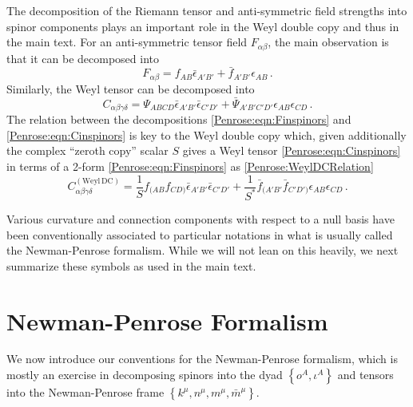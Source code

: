 The decomposition of the Riemann tensor and anti-symmetric field strengths into spinor components plays an important role in the Weyl double copy and thus in the main text. For an anti-symmetric tensor field $F_{\alpha \beta}$, the main observation is that it can be decomposed into
\begin{equation}\label{Penrose:eqn:Finspinors}
F_{\alpha \beta} = f_{AB} \bar{\epsilon}_{A' B'} +  \bar{f}_{A'B'} \epsilon_{A B} \, .
\end{equation}
Similarly, the Weyl tensor can be decomposed into
\begin{equation}\label{Penrose:eqn:Cinspinors}
C_{\alpha \beta \gamma \delta} = \Psi_{ABCD}\bar{\epsilon}_{A' B'}  \bar{\epsilon}_{C' D'} + \bar{\Psi}_{A'B'C'D'} \epsilon_{A B}  \epsilon_{C D} \, . 
\end{equation}
The relation between the decompositions \eqref{Penrose:eqn:Finspinors} and \eqref{Penrose:eqn:Cinspinors} is key to the Weyl double copy which, given additionally the complex ``zeroth copy'' scalar $S$ gives a Weyl tensor \eqref{Penrose:eqn:Cinspinors} in terms of a 2-form \eqref{Penrose:eqn:Finspinors} as \eqref{Penrose:WeylDCRelation}
\begin{equation}
C^{(\mathrm{Weyl \, DC})}_{\alpha \beta \gamma \delta} = \frac{1}{S}f_{(AB} f_{CD)}\bar{\epsilon}_{A' B'}  \bar{\epsilon}_{C' D'} + \frac{1}{S^*}\bar{f}_{(A'B'} \bar{f}_{C'D')} \epsilon_{A B}  \epsilon_{C D} \, . 
\end{equation}

Various curvature and connection components with respect to a null basis have been conventionally associated to particular notations in what is usually called the Newman-Penrose formalism. While we will not lean on this heavily, we next summarize these symbols as used in the main text.

\section{Newman-Penrose Formalism}\label{Penrose:app:NP}

We now introduce our conventions for the Newman-Penrose formalism, which is mostly an exercise in decomposing spinors into the dyad $\left\lbrace o^A, \iota^A \right \rbrace$ and tensors into the Newman-Penrose frame $\left\lbrace k^{\mu}, n^{\mu}, m^{\mu}, \bar{m}^{\mu} \right \rbrace$. 

